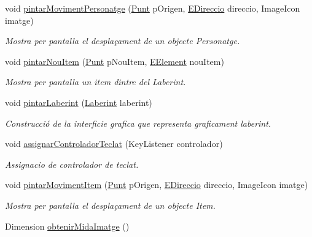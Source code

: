 \begin{DoxyCompactItemize}
\item 
void \hyperlink{classinterficie_1_1_p_laberint_a14c8ed9e53968b2f3b1c39c8e22b8ee6}{pintar\+Moviment\+Personatge} (\hyperlink{classlogica_1_1_punt}{Punt} p\+Origen, \hyperlink{enumlogica_1_1enumeracions_1_1_e_direccio}{E\+Direccio} direccio, Image\+Icon imatge)
\begin{DoxyCompactList}\small\item\em Mostra per pantalla el desplaçament de un objecte Personatge. \end{DoxyCompactList}\item 
void \hyperlink{classinterficie_1_1_p_laberint_ac189a5614b4be7b3380a41de5c56d05e}{pintar\+Nou\+Item} (\hyperlink{classlogica_1_1_punt}{Punt} p\+Nou\+Item, \hyperlink{enumlogica_1_1enumeracions_1_1_e_element}{E\+Element} nou\+Item)
\begin{DoxyCompactList}\small\item\em Mostra per pantalla un item dintre del Laberint. \end{DoxyCompactList}\item 
void \hyperlink{classinterficie_1_1_p_laberint_a8ceb1966667bf2a9ef6540701dae0bfe}{pintar\+Laberint} (\hyperlink{classlogica_1_1laberints_1_1_laberint}{Laberint} laberint)
\begin{DoxyCompactList}\small\item\em Construcció de la interficie grafica que representa graficament laberint. \end{DoxyCompactList}\item 
void \hyperlink{classinterficie_1_1_p_laberint_a5b19d218c21256e0ecfebc9b26c6d9df}{assignar\+Controlador\+Teclat} (Key\+Listener controlador)
\begin{DoxyCompactList}\small\item\em Assignacio de controlador de teclat. \end{DoxyCompactList}\item 
void \hyperlink{classinterficie_1_1_p_laberint_a3011192dc187518b6053a6216fce2b12}{pintar\+Moviment\+Item} (\hyperlink{classlogica_1_1_punt}{Punt} p\+Origen, \hyperlink{enumlogica_1_1enumeracions_1_1_e_direccio}{E\+Direccio} direccio, Image\+Icon imatge)
\begin{DoxyCompactList}\small\item\em Mostra per pantalla el desplaçament de un objecte Item. \end{DoxyCompactList}\item 
Dimension \hyperlink{classinterficie_1_1_p_laberint_a75f1299521583b891d6af4e0fa0df179}{obtenir\+Mida\+Imatge} ()

\end{DoxyCompactItemize}
